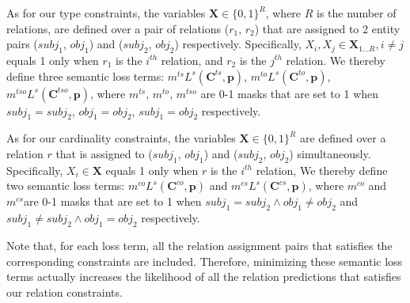 As for our type constraints, the variables $\bm{X}\in \{0,1\}^{R}$, where $R$ is the number of relations,
are defined over a pair of relations ($r_1$, $r_2$) that are assigned to 2 entity pairs ($subj_1$, $obj_1$) and ($subj_2$, $obj_2$) respectively.
Specifically, $X_i, X_j\in \bm{X}_{1...R}, i\neq j$ equals 1 only when $r_1$ is the $i^{th}$ relation,
and $r_2$ is the $j^{th}$ relation.
We thereby define three semantic loss terms: $m^{ts}L^{s}(\bm{C}^{ts}, \bm{p})$, $m^{to}L^{s}(\bm{C}^{to}, \bm{p})$, $m^{tso}L^{s}(\bm{C}^{tso}, \bm{p})$, where $m^{ts}$, $m^{to}$, $m^{tso}$ are 0-1 masks that are set to 1 when $subj_1=subj_2$, $obj_1=obj_2$, $subj_1=obj_2$ respectively.

As for our cardinality constraints, the variables $\bm{X}\in \{0,1\}^{R}$ are defined over a relation $r$ that is assigned to ($subj_1$, $obj_1$) and ($subj_2$, $obj_2$) simultaneously.
Specifically, $X_i\in \bm{X}$ equals 1 only when $r$ is the $i^{th}$ relation,
We thereby define two semantic loss terms: $m^{co}L^{s}(\bm{C}^{co}, \bm{p})$ and $m^{cs}L^{s}(\bm{C}^{cs}, \bm{p})$, where $m^{co}$ and $m^{cs}$are 0-1 masks that are set to 1 when $subj_1=subj_2 \land obj_1\neq obj_2$ and $subj_1\neq subj_2 \land obj_1=obj_2$ respectively.

Note that, for each loss term, all the relation assignment pairs that satisfies the corresponding constraints are included.
Therefore, minimizing these semantic loss terms actually increases the likelihood of all the relation predictions that satisfies our relation constraints.



